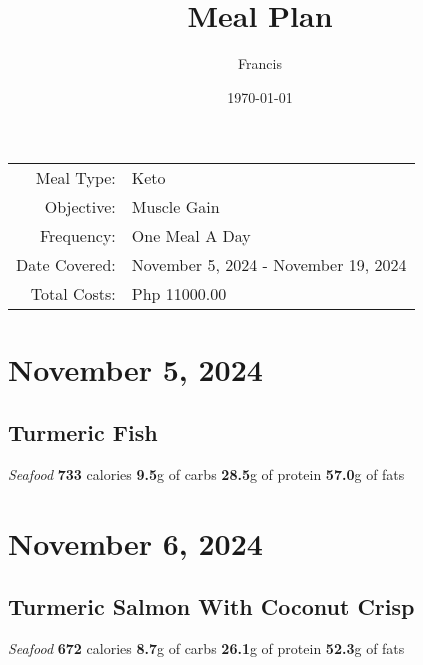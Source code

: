 \documentclass{article}%
\title{Meal Plan}%
\author{Francis}%
\date{\today}%
\begin{document}
%
\normalsize%
\maketitle%


\begin{table}[H]%
\begin{tabular}{rl}%
Meal Type:&Keto\\%
Objective:&Muscle Gain\\%
Frequency:&One Meal A Day\\%
Date Covered:&November 5, 2024 {-} November 19, 2024\\%
Total Costs:&Php 11000.00\\%
\end{tabular}%
\end{table}

%
\section*{November 5, 2024}%
\label{sec:November5,2024}%
\begin{paracol}[1]{1}%
\sloppy%
\subsection*{Turmeric Fish}%
\label{subsec:TurmericFish}%
\textit{Seafood}%
\newline%
\newline%
\textbf{733} calories%
\newline%
\textbf{9.5}g of carbs%
\newline%
\textbf{28.5}g of protein%
\newline%
\textbf{57.0}g of fats%
\newline%
\switchcolumn

%
\end{paracol}

%
\section*{November 6, 2024}%
\label{sec:November6,2024}%
\begin{paracol}[1]{1}%
\sloppy%
\subsection*{Turmeric Salmon With Coconut Crisp}%
\label{subsec:TurmericSalmonWithCoconutCrisp}%
\textit{Seafood}%
\newline%
\newline%
\textbf{672} calories%
\newline%
\textbf{8.7}g of carbs%
\newline%
\textbf{26.1}g of protein%
\newline%
\textbf{52.3}g of fats%
\newline%
\switchcolumn

%
\end{paracol}
\end{document}
